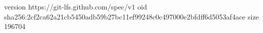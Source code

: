 version https://git-lfs.github.com/spec/v1
oid sha256:2cf2ca62a21cb5450adb59b27bc11ef99248c0c497000e2bfdff6d5053af4ace
size 196704
